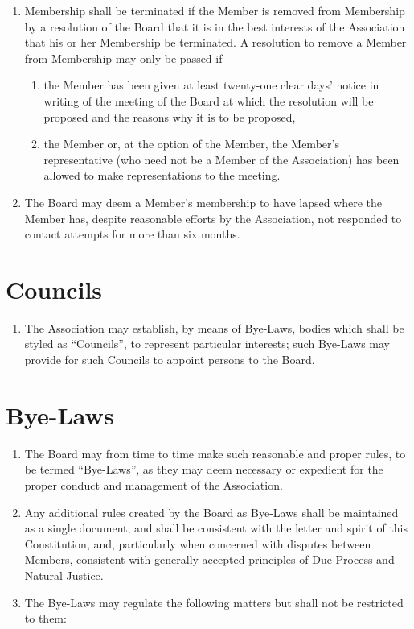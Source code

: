 \documentclass[10pt]{mk-articles-of-association}
\newcommand{\mysection}[1]{
  \end{enumerate}
  \section*{#1}
  \begin{enumerate}[resume]
}
\newcommand{\EC}[0]{Board}
\newcommand{\Exec}[0]{\EC{} }
\begin{document}
\begin{enumerate}
\item Membership shall be terminated if
\label{expulsion}
  the Member is removed from Membership by a resolution of the
  \Exec that it is in the best interests of the Association that his or
  her Membership be terminated. A resolution to remove a Member from
  Membership may only be passed if

\begin{enumerate}

\item the Member has been given at least twenty-one clear days' notice in
  writing of the meeting of the \Exec at which the resolution will
  be proposed and the reasons why it is to be proposed,

\item the Member or, at the option of the Member, the Member's
  representative (who need not be a Member of the Association) has been
  allowed to make representations to the meeting.

\end{enumerate}

\item The \Exec may deem a Member's membership to have lapsed where
  the Member has, despite reasonable efforts by the Association, not
  responded to contact attempts for more than six months.
  \label{lapse}


\mysection{Councils}

\item The Association may establish, by means of Bye-Laws, bodies which
  shall be styled as ``Councils'', to represent particular interests;
  such Bye-Laws may provide for such Councils to appoint persons to
  the \EC{}.\label{councils}



\mysection{Bye-Laws}

\item The \Exec may from time to time make such reasonable and proper
  rules, to be termed ``Bye-Laws'', as they may deem necessary or
  expedient for the proper conduct and management of the Association.

\item Any additional rules created by the \Exec as Bye-Laws
  shall be maintained as a single document, and shall be
  consistent with the letter and spirit of this Constitution, and,
  particularly when concerned with disputes between Members,
  consistent with generally accepted principles of Due Process and
  Natural Justice.

\item The Bye-Laws may regulate the following matters but shall not be
  restricted to them:


\end{enumerate}
\end{document}
